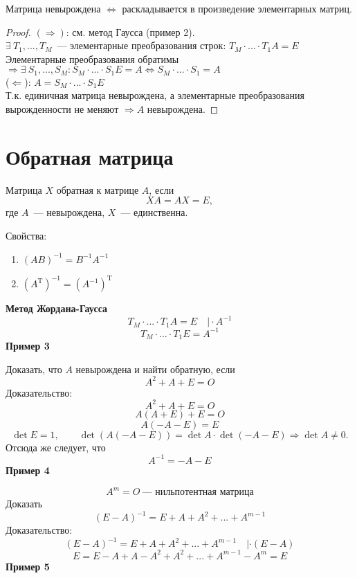 \begin{theorem}
	Матрица невырождена $\Leftrightarrow$ раскладывается в произведение элементарных матриц.
\end{theorem}
\begin{proof}
$(\Rightarrow)$: см. метод Гаусса (пример 2).\\
$\exists\  T_1,...,T_M$~--- элементарные преобразования строк: $T_M\cdot ...\cdot T_1 A=E$\\
Элементарные преобразования обратимы $\Rightarrow \exists\  S_1,...,S_M: S_M\cdot ...\cdot S_1 E=A\Leftrightarrow S_M\cdot ...\cdot S_1=A$\\
($\Leftarrow$): $A=S_M\cdot ...\cdot S_1 E$\\
Т.к. единичная матрица невырождена, а элементарные преобразования вырожденности не меняют $\Rightarrow A$ невырождена.
\end{proof}
\section{Обратная матрица}
\begin{definition}
Матрица $X$ обратная к матрице $A$, если
$$XA=AX=E,$$
где $A$~--- невырождена, $X$~--- единственна.
\end{definition}

Свойства:
\begin{enumerate}
	\item $(AB)^{-1}=B^{-1}A^{-1}$
	\item $(A^{\mathrm{T}})^{-1}=(A^{-1})^{\mathrm{T}}$
\end{enumerate}

\textbf{Метод Жордана-Гаусса}\\
$$T_M\cdot...\cdot T_1 A=E \quad|\!\cdot A^{-1}$$
$$T_M\cdot...\cdot T_1 E = A^{-1}$$
\textbf{Пример 3}

Доказать, что $A$ невырождена и найти обратную, если
$$A^2+A+E=O$$
Доказательство:
$$A^2+A+E=O$$
$$A(A+E)+E=O$$
$$A(-A-E)=E$$
$$\det E = 1,\qquad \det(A(-A-E))=\det A\cdot\det (-A-E) \Rightarrow \det A \neq 0.$$
Отсюда же следует, что $$A^{-1}=-A-E$$
\textbf{Пример 4}

$$A^m=O\ \text{--- нильпотентная матрица}$$
Доказать $$(E-A)^{-1}=E+A+A^2+...+A^{m-1}$$
Доказательство:
$$(E-A)^{-1}=E+A+A^2+...+A^{m-1}\quad |\cdot (E-A)$$
$$E=E-A+A-A^2+A^2+...+A^{m-1}-A^m=E$$
\textbf{Пример 5}\vspace{1mm}

